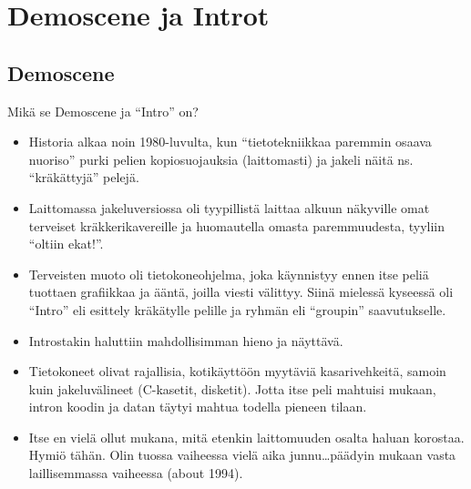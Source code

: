 \documentclass[pdf,10pt]{beamer}
\begin{document}
\section{Demoscene ja Introt}
\subsection{Demoscene}
\begin{frame}{Mikä se Demoscene ja ``Intro'' on?}
  \begin{itemize}
  \item Historia alkaa noin 1980-luvulta, kun ``tietotekniikkaa
    paremmin osaava nuoriso'' purki pelien kopiosuojauksia
    (laittomasti) ja jakeli näitä ns. ``kräkättyjä'' pelejä.
  \item Laittomassa jakeluversiossa oli tyypillistä laittaa alkuun
    näkyville omat terveiset kräkkerikavereille ja huomautella omasta
    paremmuudesta, tyyliin ``oltiin ekat!''.
  \item Terveisten muoto oli tietokoneohjelma, joka käynnistyy ennen
    itse peliä tuottaen grafiikkaa ja ääntä, joilla viesti
    välittyy. Siinä mielessä kyseessä oli ``Intro'' eli esittely
    kräkätylle pelille ja ryhmän eli ``groupin'' saavutukselle.
  \item Introstakin haluttiin mahdollisimman hieno ja näyttävä.
  \item Tietokoneet olivat rajallisia, kotikäyttöön myytäviä
    kasarivehkeitä, samoin kuin jakeluvälineet (C-kasetit,
    disketit). Jotta itse peli mahtuisi mukaan, intron koodin
    ja datan täytyi mahtua todella pieneen tilaan.
  \item Itse en vielä ollut mukana, mitä etenkin laittomuuden osalta
    haluan korostaa. Hymiö tähän. Olin tuossa vaiheessa vielä aika
    junnu\ldots päädyin mukaan vasta laillisemmassa vaiheessa (about
    1994).
\end{itemize}
\end{frame}
\end{document}
